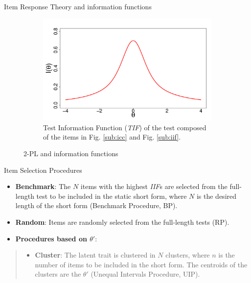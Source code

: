\documentclass[final,t]{beamer}
\begin{document}
\begin{frame}
\begin{columns}[t]
\begin{column}{.45\linewidth}
\begin{block}{\centering Item Response Theory and information functions}
\begin{figure}
		\begin{subfigure}{.45\linewidth}
			\includegraphics[width=\linewidth]{img/tif.pdf}
			\caption{Test Information Function (\emph{TIF}) of the test composed of the items in Fig. \ref{sub:icc} and Fig. \ref{sub:iif}.}
			\label{sub:tif}
		\end{subfigure}
		\caption{2-PL and information functions}
	\end{figure}
\end{block}
			
		
				

				
				\begin{block}{\centering Item Selection Procedures}
					 \begin{itemize}
					 	\item \textbf{Benchmark}: The $N$ items with the highest \emph{IIF}s are selected from the full-length test to be included in the static short form, where $N$ is the desired length of the short form (Benchmark Procedure, BP).
					 
					 	\item \textbf{Random}: Items are randomly selected from the full-length tests (RP).
					 	
					 	\item \textbf{Procedures based on $\theta'$}:
					 \end{itemize}
					 	\begin{quote}
					 		\begin{itemize}
					 			
					 			\item \textbf{Cluster}: The latent trait is clustered in $N$ clusters, where $n$ is the number of items to be included in the short form. The centroids of the clusters are the $\theta'$ (Unequal Intervals Procedure, UIP).
					 			

\end{itemize}
\end{quote}
\end{block}
\end{column}
\end{columns}
\end{frame}
\end{document}
